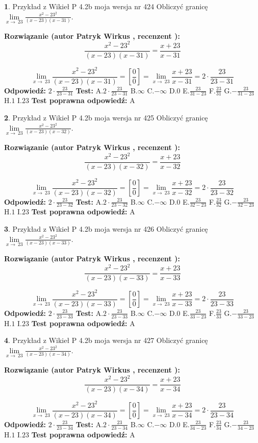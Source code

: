 \documentclass[12pt, a4paper]{article}
\theoremstyle{definition} %
\newtheorem{zad}{}
\newcommand{\zadStart}[1]{\begin{zad}#1\newline}
\newcommand{\zadStop}{\end{zad}}
\newcommand{\rozwStart}[2]{\noindent \textbf{Rozwiązanie (autor #1 , recenzent #2): }\newline}
\newcommand{\rozwStop}{\newline}
\newcommand{\odpStart}{\noindent \textbf{Odpowiedź:}\newline}
\newcommand{\odpStop}{\newline}
\newcommand{\testStart}{\noindent \textbf{Test:}\newline}
\newcommand{\testStop}{\newline}
\newcommand{\kluczStart}{\noindent \textbf{Test poprawna odpowiedź:}\newline}
\newcommand{\kluczStop}{\newline}
\begin{document}
\zadStart{Przykład z Wikieł P 4.2b moja wersja nr 424}
Obliczyć granicę $\lim\limits_{x\to\ 23}\frac{x^{2}-23^{2}}{(x-23)(x-31)}$.
\zadStop
\rozwStart{Patryk Wirkus}{}
$$\frac{x^{2}-23^{2}}{(x-23)(x-31)}=\frac{x+23}{x-31}$$

$$\lim\limits_{x\to\ 23}\frac{x^{2}-23^{2}}{(x-23)(x-31)}=[\frac{0}{0}]=\lim\limits_{x\to\ 23}\frac{x+23}{x-31}=2 \cdot \frac{23}{23-31}$$
\rozwStop
\odpStart
$2 \cdot \frac{23}{23-31}$
\odpStop
\testStart
A.$2 \cdot \frac{23}{23-31}$
B.$\infty$
C.$-\infty$
D.$0$
E.$\frac{23}{31-23}$
F.$\frac{23}{31}$
G.$-\frac{23}{31-23}$
H.$1$
I.$23$
\testStop
\kluczStart
A
\kluczStop



\zadStart{Przykład z Wikieł P 4.2b moja wersja nr 425}
Obliczyć granicę $\lim\limits_{x\to\ 23}\frac{x^{2}-23^{2}}{(x-23)(x-32)}$.
\zadStop
\rozwStart{Patryk Wirkus}{}
$$\frac{x^{2}-23^{2}}{(x-23)(x-32)}=\frac{x+23}{x-32}$$

$$\lim\limits_{x\to\ 23}\frac{x^{2}-23^{2}}{(x-23)(x-32)}=[\frac{0}{0}]=\lim\limits_{x\to\ 23}\frac{x+23}{x-32}=2 \cdot \frac{23}{23-32}$$
\rozwStop
\odpStart
$2 \cdot \frac{23}{23-32}$
\odpStop
\testStart
A.$2 \cdot \frac{23}{23-32}$
B.$\infty$
C.$-\infty$
D.$0$
E.$\frac{23}{32-23}$
F.$\frac{23}{32}$
G.$-\frac{23}{32-23}$
H.$1$
I.$23$
\testStop
\kluczStart
A
\kluczStop



\zadStart{Przykład z Wikieł P 4.2b moja wersja nr 426}
Obliczyć granicę $\lim\limits_{x\to\ 23}\frac{x^{2}-23^{2}}{(x-23)(x-33)}$.
\zadStop
\rozwStart{Patryk Wirkus}{}
$$\frac{x^{2}-23^{2}}{(x-23)(x-33)}=\frac{x+23}{x-33}$$

$$\lim\limits_{x\to\ 23}\frac{x^{2}-23^{2}}{(x-23)(x-33)}=[\frac{0}{0}]=\lim\limits_{x\to\ 23}\frac{x+23}{x-33}=2 \cdot \frac{23}{23-33}$$
\rozwStop
\odpStart
$2 \cdot \frac{23}{23-33}$
\odpStop
\testStart
A.$2 \cdot \frac{23}{23-33}$
B.$\infty$
C.$-\infty$
D.$0$
E.$\frac{23}{33-23}$
F.$\frac{23}{33}$
G.$-\frac{23}{33-23}$
H.$1$
I.$23$
\testStop
\kluczStart
A
\kluczStop



\zadStart{Przykład z Wikieł P 4.2b moja wersja nr 427}
Obliczyć granicę $\lim\limits_{x\to\ 23}\frac{x^{2}-23^{2}}{(x-23)(x-34)}$.
\zadStop
\rozwStart{Patryk Wirkus}{}
$$\frac{x^{2}-23^{2}}{(x-23)(x-34)}=\frac{x+23}{x-34}$$

$$\lim\limits_{x\to\ 23}\frac{x^{2}-23^{2}}{(x-23)(x-34)}=[\frac{0}{0}]=\lim\limits_{x\to\ 23}\frac{x+23}{x-34}=2 \cdot \frac{23}{23-34}$$
\rozwStop
\odpStart
$2 \cdot \frac{23}{23-34}$
\odpStop
\testStart
A.$2 \cdot \frac{23}{23-34}$
B.$\infty$
C.$-\infty$
D.$0$
E.$\frac{23}{34-23}$
F.$\frac{23}{34}$
G.$-\frac{23}{34-23}$
H.$1$
I.$23$
\testStop
\kluczStart
A
\kluczStop
\end{document}
